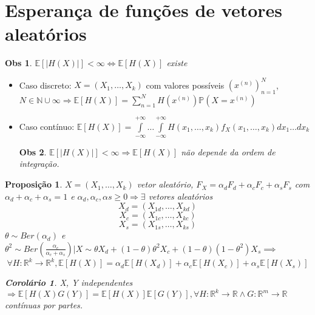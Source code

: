 \documentclass[12pt, letterpaper]{article}
\newtheorem{corollary}{Corolário}
\newtheorem{remark}{Obs}
\newtheorem{proposition}{Proposição}
\theoremstyle{definition}
\begin{document}
  \section{Esperança de funções de vetores aleatórios}
  \begin{remark}
          \(\mathbb{E}[|H(X)|] < \infty \iff \mathbb{E}[H(X)]\) existe
  \end{remark}
  \begin{itemize}
    \item Caso discreto: \(X = (X_{1},\dots, X_{k})\) com valores possíveis \((x^{(n)})^{N}_{n=1}\), \(N \in \mathbb{N}\cup {\infty} \Rightarrow \mathbb{E}[H(X)] = \sum\limits_{n=1}^{N}H(x^{(n)})\mathbb{P}(X = x^{(n)})  \)
    \item Caso contínuo: \(\mathbb{E}[H(X)] = \int\limits_{-\infty}^{+\infty}\dots \int\limits_{-\infty}^{+\infty}H(x_{1},\dots,x_{k})f_{X}(x_{1},\dots, x_{k})dx_{1}\dots dx_{k}\)
          \begin{remark}
            \(\mathbb{E}[|H(X)|]<\infty \Rightarrow \mathbb{E}[H(X)]\) não depende da ordem de integração.
          \end{remark}
  \end{itemize}
  \begin{proposition}
    \(X = (X_{1},\dots, X_{k})\) vetor aleatório, \(F_{X}= \alpha_{d}F_{d} + \alpha_{c}F_{c} + \alpha_{s}F_{s}\) com \(\alpha_{d} + \alpha_{c}+ \alpha_{s}= 1 \) e \(\alpha_{d},\alpha_{c},\alpha{s} \geq 0 \Rightarrow \exists\) vetores aleatórios \[X_{d}=(X_{1d},\dots,X_{kd})\]
    \[X_{c}=(X_{1c},\dots,X_{kc})\]
    \[X_{s}=(X_{1s},\dots,X_{ks})\] \(\theta \sim Ber(\alpha_{d}) \) e \(\theta^{2} \sim Ber(\frac{\alpha_{c}}{\alpha_{c}+\alpha_{s}}) |  X \sim \theta X_{d} + (1-\theta)\theta^{2}X_{c}+ (1-\theta)(1-\theta^{2})X_{s} \implies \) \[\forall H\colon \mathbb{R}^{k} \to \mathbb{R}^{k}, \mathbb{E}[H(X)] = \alpha_{d}\mathbb{E}[H(X_{d})] + \alpha_{c}\mathbb{E}[H(X_{c})] + \alpha_{s}\mathbb{E}[H(X_{s})]  \]
    \begin{corollary}
      X, Y independentes \( \Rightarrow \mathbb{E}[H(X)G(Y)] = \mathbb{E}[H(X)]\mathbb{E}[G(Y)], \forall H \colon \mathbb{R}^{k} \to \mathbb{R} \wedge G \colon \mathbb{R}^{m} \to \mathbb{R}\) contínuas por partes.

    \end{corollary}

  \end{proposition}
\end{document}
